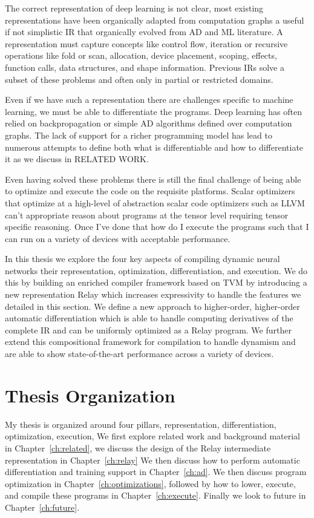 The correct representation of deep learning is not clear, most
  existing representations have been organically adapted from
  computation graphs a useful if not simplistic IR that organically
  evolved from AD and ML literature.
A representation must capture concepts like control flow, iteration
  or recursive operations like fold or scan, allocation,
  device placement, scoping, effects, function calls, data structures,
  and shape information.
Previous IRs solve a subset of these problems and often only in partial
  or restricted domains.

Even if we have such a representation there are challenges specific to
 machine learning, we must be able to differentiate the programs.
Deep learning has often relied on backpropagation or simple AD algorithms
  defined over computation graphs.
The lack of support for a richer programming model has lead to numerous
  attempts to define both what is differentiable and how to differentiate
  it as we discuss in RELATED WORK.

Even having solved these problems there is still the final challenge of being
  able to optimize and execute the code on the requisite platforms.
Scalar optimizers that optimize at a high-level of abstraction scalar code optimizers such as LLVM can't appropriate reason
  about programs at the tensor level requiring tensor specific reasoning.
Once I've done that how do I execute the programs such that I can run
  on a variety of devices with acceptable performance.

In this thesis we explore the four key aspects of compiling dynamic
  neural networks their representation, optimization, differentiation,
  and execution.
We do this by building an enriched compiler framework based on TVM by introducing
  a new representation Relay which increases expressivity to handle the features
  we detailed in this section.
We define a new approach to higher-order, higher-order automatic differentiation
  which is able to handle computing derivatives of the complete IR and
  can be uniformly optimized as a Relay program.
We further extend this compositional framework for compilation to handle dynamism
  and are able to show state-of-the-art performance across a variety of devices.

\section{Thesis Organization}

My thesis is organized around four pillars, representation, differentiation, optimization, execution,
We first explore related work and background material in Chapter~\ref{ch:related},
  we discuss the design of the Relay intermediate representation in Chapter~\ref{ch:relay}
We then discuss how to perform automatic differentiation and training support in Chapter~\ref{ch:ad}.
We then discuss program optimization in Chapter~\ref{ch:optimizations},
  followed by how to lower, execute, and compile these programs in
  Chapter~\ref{ch:execute}.
Finally we look to future in Chapter~\ref{ch:future}.

